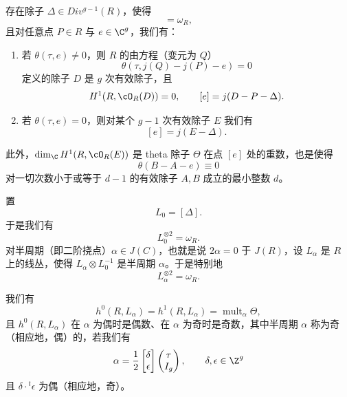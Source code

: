 \begin{theorem}[1.10]
存在除子 $\Delta\in Div^{g-1}(R)$，使得
\begin{equation}
  [2\Delta]=\omega_R, \tag{1.31}
\end{equation}
且对任意点 $P\in R$ 与 $e\in\C^g$，我们有：
\begin{enumerate}[label=(\arabic*)]
\item 若 $\theta(\tau,e)\ne0$，则 $R$ 的由方程（变元为 $Q$）
\[
  \theta(\tau,j(Q)-j(P)-e)=0
\]
定义的除子 $D$ 是 $g$ 次有效除子，且
\[
  H^1(R,\cO_R(D))=0,\qquad [e]=j(D-P-\Delta).
\]
\item 若 $\theta(\tau,e)=0$，则对某个 $g-1$ 次有效除子 $E$ 我们有
\[
  [e]=j(E-\Delta).
\]
\end{enumerate}
此外，$\dim_\C H^1(R,\cO_R(E))$ 是 theta 除子 $\Theta$ 在点 $[e]$ 处的重数，也是使得
\[
  \theta(B-A-e)\equiv0
\]
对一切次数小于或等于 $d-1$ 的有效除子 $A,B$ 成立的最小整数 $d$。
\end{theorem}

置
\begin{equation}
  L_0=[\Delta]. \tag{1.32}
\end{equation}
于是我们有
\begin{equation}
  L_0^{\otimes2}=\omega_R. \tag{1.33}
\end{equation}
对半周期（即二阶挠点）$\alpha\in J(C)$，也就是说 $2\alpha=0$ 于 $J(R)$，设 $L_\alpha$ 是 $R$ 上的线丛，使得 $L_\alpha\otimes L_0^{-1}$ 是半周期 $\alpha$。于是特别地
\begin{equation}
  L_\alpha^{\otimes2}=\omega_R. \tag{1.34}
\end{equation}

\begin{corollary}[1.11]
我们有
\begin{equation}
  h^0(R,L_\alpha)=h^1(R,L_\alpha)=\operatorname{mult}_\alpha\Theta, \tag{1.35}
\end{equation}
且 $h^0(R,L_\alpha)$ 在 $\alpha$ 为偶时是偶数、在 $\alpha$ 为奇时是奇数，其中半周期 $\alpha$ 称为奇（相应地，偶）的，若我们有
\[
  \alpha=\frac{1}{2}\begin{bmatrix}\delta\\ \epsilon\end{bmatrix}\begin{pmatrix}\tau\\ I_g\end{pmatrix},\qquad \delta,\epsilon\in\Z^g
\]
且 $\delta\cdot{}^t\epsilon$ 为偶（相应地，奇）。
\end{corollary}

